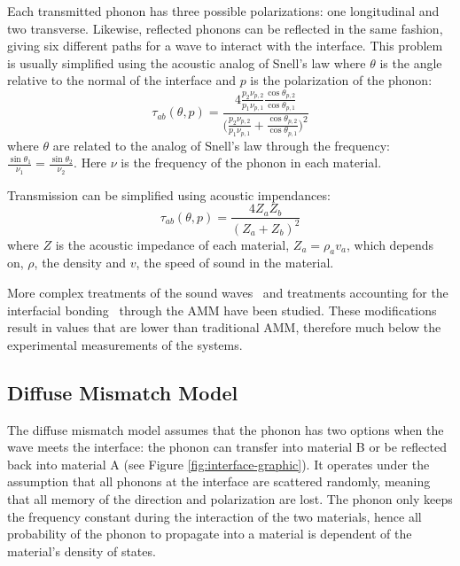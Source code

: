 Each transmitted phonon has three possible polarizations: one longitudinal and two transverse. Likewise, reflected phonons can be reflected in the same fashion, giving six different paths for a wave to interact with the interface. This problem is usually simplified using the acoustic analog of Snell’s law where $\theta$ is the angle relative to the normal of the interface and $p$ is the polarization of the phonon:
\begin{equation}
\tau_{ab}(\theta, p) = \frac{4\frac{p_2 \nu_{p, 2}}{p_1 \nu_{p,1}} \frac{\cos{\theta_{p,2}}}{\cos{\theta_{p,1}}}}{\big( \frac{p_2 \nu_{p, 2}}{p_1 \nu_{p,1}}+ \frac{\cos{\theta_{p,2}}}{\cos{\theta_{p,1}}}\big)^2}
\end{equation}
where $\theta$ are related to the analog of Snell's law through the frequency: \(\frac{\sin{\theta_1}}{\nu_1} = \frac{\sin{\theta_2}}{\nu_2}\). Here $\nu$ is the frequency of the phonon in each material.

Transmission can be simplified using acoustic impendances:
\begin{equation}
\tau_{ab}(\theta, p) = \frac{4Z_a Z_b}{(Z_a +Z_b)^2}
\end{equation}
where $Z$ is the acoustic impedance of each material, $Z_a = \rho_a v_a$, which depends on, $\rho$, the density and $v$, the speed of sound in the material. 

More complex treatments of the sound waves~\cite{Prasher2000} and treatments accounting for the interfacial bonding~\cite{Prasher2009} through the AMM have been studied. These modifications result in values that are lower than traditional AMM, therefore much below the experimental measurements of the systems.~\cite{Cahill2006, Stoner1993}

\subsection{Diffuse Mismatch Model}
The diffuse mismatch model assumes that the phonon has two options when the wave meets the interface: the phonon can transfer into material B or be reflected back into material A (see Figure \ref{fig:interface-graphic}). It operates under the assumption that all phonons at the interface are scattered randomly, meaning that all memory of the direction and polarization are lost. The phonon only keeps the frequency constant during the interaction of the two materials, hence all probability of the phonon to propagate into a material is dependent of the material's density of states. 

